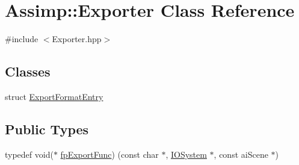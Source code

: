 \hypertarget{class_assimp_1_1_exporter}{}\section{Assimp\+:\+:Exporter Class Reference}
\label{class_assimp_1_1_exporter}


{\ttfamily \#include $<$Exporter.\+hpp$>$}

\subsection*{Classes}
\begin{DoxyCompactItemize}
\item 
struct \hyperlink{struct_assimp_1_1_exporter_1_1_export_format_entry}{Export\+Format\+Entry}
\end{DoxyCompactItemize}
\subsection*{Public Types}
\begin{DoxyCompactItemize}
\item 
typedef void($\ast$ \hyperlink{class_assimp_1_1_exporter_a6641de13026c5ce4a05ead71a8097204}{fp\+Export\+Func}) (const char $\ast$, \hyperlink{class_assimp_1_1_i_o_system}{I\+O\+System} $\ast$, const ai\+Scene $\ast$)
\end{DoxyCompactItemize}
